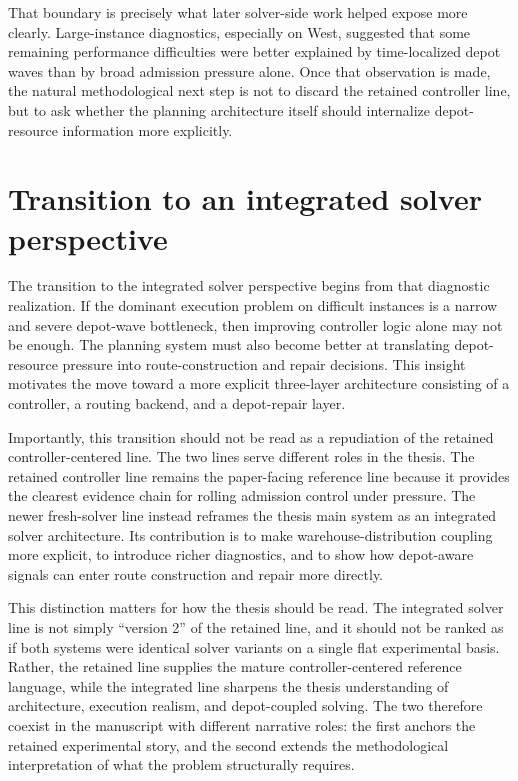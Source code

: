 That boundary is precisely what later solver-side work helped expose more clearly. Large-instance diagnostics, especially on West, suggested that some remaining performance difficulties were better explained by time-localized depot waves than by broad admission pressure alone. Once that observation is made, the natural methodological next step is not to discard the retained controller line, but to ask whether the planning architecture itself should internalize depot-resource information more explicitly.

\section{Transition to an integrated solver perspective}

The transition to the integrated solver perspective begins from that diagnostic realization. If the dominant execution problem on difficult instances is a narrow and severe depot-wave bottleneck, then improving controller logic alone may not be enough. The planning system must also become better at translating depot-resource pressure into route-construction and repair decisions. This insight motivates the move toward a more explicit three-layer architecture consisting of a controller, a routing backend, and a depot-repair layer.

Importantly, this transition should not be read as a repudiation of the retained controller-centered line. The two lines serve different roles in the thesis. The retained controller line remains the paper-facing reference line because it provides the clearest evidence chain for rolling admission control under pressure. The newer fresh-solver line instead reframes the thesis main system as an integrated solver architecture. Its contribution is to make warehouse-distribution coupling more explicit, to introduce richer diagnostics, and to show how depot-aware signals can enter route construction and repair more directly.

This distinction matters for how the thesis should be read. The integrated solver line is not simply ``version 2'' of the retained line, and it should not be ranked as if both systems were identical solver variants on a single flat experimental basis. Rather, the retained line supplies the mature controller-centered reference language, while the integrated line sharpens the thesis understanding of architecture, execution realism, and depot-coupled solving. The two therefore coexist in the manuscript with different narrative roles: the first anchors the retained experimental story, and the second extends the methodological interpretation of what the problem structurally requires.

